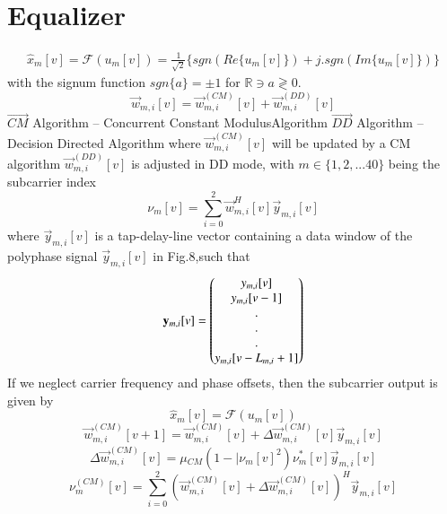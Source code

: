 \documentclass[journal,12pt,onecolumn]{IEEEtran}
\begin{document}
\section{Equalizer}
\begin{align*}
 \hat{x}_m[v] ={\mathcal{F}}(u_m[v])=\frac{1}{\sqrt{2}}\{sgn(Re\{u_m[v]\}) +         j.sgn(Im\{u_m[v]\})\}
\end{align*}
with the signum function $sgn\{a\} = \pm{1}$ for $\mathbb{R} \ni a \gtrless 0.$ 
 \begin{equation*}
 \vec{w}_{m,i}[v] = \vec{w}^{(CM)}_{m,i}[v] + \vec{w}^{(DD)}_{m,i}[v]
 \end{equation*}
 $\vec{CM}$ Algorithm -- Concurrent Constant ModulusAlgorithm
 \newline
 $\vec{DD}$ Algorithm -- Decision Directed Algorithm
 \newline
 \newline
 where $\vec{w}^{(CM)}_{m,i}[v]$ will be updated by a CM algorithm
 \newline
 $\vec{w}^{(DD)}_{m,i}[v]$ is adjusted in DD mode, with $m \in \{1, 2, . . . 40\}$
being the subcarrier index
 \begin{equation*}
 \nu_m[v] =\sum_{i=0}^{2}\vec{w}^{H}_{m,i}[v] \vec{y}_{m,i}[v]
 \end{equation*}
where $\vec{y}_{m,i}[v]$ is a tap-delay-line vector containing a data
window of the polyphase signal $\vec{y}_{m,i}[v]$ in Fig.8,such that
\begin{equation*}
\mathbf{y}_{m,i}[v] = \begin{pmatrix}y_{m,i}[v]\\y_{m,i}[v -1]\\.\\.\\.\\y_{m,i}[v- L_{m,i} + 1]\end{pmatrix}
\end{equation*}
 If we neglect carrier frequency and phase offsets, then the
subcarrier output is given by
  \begin{equation*}
 \hat{x}_m[v] ={\mathcal{F}}(u_m[v])
  \end{equation*}
 \begin{equation*}
\vec{w}^{(CM)}_{m,i}[v+1] = \vec{w}^{(CM)}_{m,i}[v] + \Delta{\vec{w}^{(CM)}_{m,i}[v]}\vec{y}_{m,i}[v]
 \end{equation*}
 \begin{equation*}
\Delta{\vec{w}^{(CM)}_{m,i}[v]} = \mu{_{CM}}(1 - \mid{{\nu_m[v]}^2}){\nu^*_m[v]}\vec{y}_{m,i}[v]
\end{equation*}
 \begin{equation*}
{\nu^{(CM)}_m[v]} = \sum_{i=0}^{2} (\vec{w}^{(CM)}_{m,i}[v] + \Delta{\vec{w}^{(CM)}_{m,i}[v]})^{H}\vec{y}_{m,i}[v]
\end{equation*}
\end{document}
